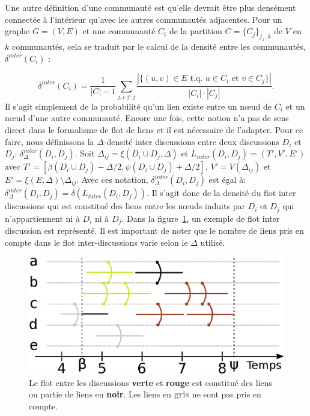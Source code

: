 Une autre définition d'une communauté est qu'elle devrait être plus densément connectée à l'intérieur qu'avec les autres communautés adjacentes.
Pour un graphe $G=(V,E)$ et une communauté $C_i$ de la partition $C = \{C_j\}_{j_1..k}$ de $V$ en $k$ communautés, cela se traduit par le calcul de la densité entre les communautés, $\delta^{inter}(C_i)$ :

\begin{equation}
	\delta^{inter}(C_i) = \frac{1}{|C|-1}\sum_{j, i\ne j}\frac{|\{(u,v)\in E\mbox{ t.q. }u\in C_i\mbox{ et }v\in C_j\}|}{|C_i|\cdot |C_j|}.
\end{equation}
Il s'agit simplement de la probabilité qu'un lien existe entre un n\oe{}ud de $C_i$ et un n\oe{}ud d'une autre communauté.
Encore une fois, cette notion n'a pas de sens direct dans le formalisme de flot de liens et il est nécessaire de l'adapter.
Pour ce faire, nous définissons la $\Delta$-densité inter discussions entre deux discussions $D_i$ et $D_j$: $\delta^{inter}_{\Delta}(D_i,D_j)$.
Soit $\Delta_{ij}=\xi(D_i \cup D_j,\Delta)$ et $L_{inter}(D_i, D_j) = (T',V',E')$ avec $T'=[\beta(D_i \cup D_j) - \Delta/2,\psi(D_i \cup D_j) + \Delta/2]$, $V'= V(\Delta_{ij})$ et $E' = \xi(E,\Delta) \setminus \Delta_{ij}$.
Avec ces notation, $\delta^{inter}_{\Delta}(D_i,D_j)$ est égal à: $\delta^{inter}_{\Delta}(D_i,D_j) = \delta(L_{inter}(D_i, D_j))$.
Il s'agit donc de la densité du flot inter discussions qui est constitué des liens entre les n\oe{}uds induits par $D_i$ et $D_j$ qui n'appartiennent ni à $D_i$ ni à $D_j$.
Dans la figure~\ref{fig:inter_dens_discussion_ex}, un exemple de flot inter discussion est représenté.
Il est important de noter que le nombre de liens pris en compte dans le flot inter-discussions varie selon le $\Delta$ utilisé.

\begin{figure}
\centering
	\includegraphics[width=0.65\linewidth]{img/mailing/inter_flot.eps}
\caption{Le flot entre les discussions \textcolor{olivegreen}{\textbf{verte}} et \textcolor{briquered}{\textbf{rouge}} est constitué des liens ou partie de liens en \textbf{noir}. Les liens en \textcolor{gray}{\textbf{gris}} ne sont pas pris en compte.}
\label{fig:inter_dens_discussion_ex}
\end{figure}



